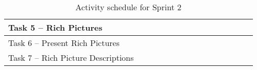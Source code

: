 \begin{table}[h!]
\begin{tabular}{@{}lllllllllllllll@{}}
Task 5 -- Rich Pictures                          &                          &                          &                          &                          &                          &                          &                          &                          & \cellcolor[HTML]{C0C0C0} & \cellcolor[HTML]{C0C0C0} & \cellcolor[HTML]{C0C0C0} &                          &   &   \\ \midrule
Task 6 -- Present Rich Pictures                  &                          &                          &                          &                          &                          &                          &                          &                          &                          &                          &                          & \cellcolor[HTML]{C0C0C0} &   &   \\ \midrule
Task 7 -- Rich Picture Descriptions              &                          &                          &                          &                          &                          &                          &                          &                          & \cellcolor[HTML]{C0C0C0} & \cellcolor[HTML]{C0C0C0} & \cellcolor[HTML]{C0C0C0} &                          &   &   \\ \bottomrule
\end{tabular}
\caption{Activity schedule for Sprint 2}
\label{table_sprint}
\end{table}
